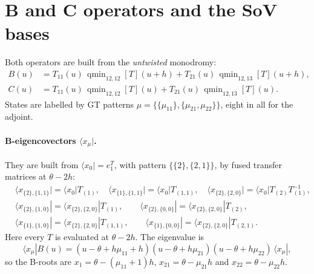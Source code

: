 \documentclass[11pt]{article}
\newcommand{\qmin}{\operatorname{qmin}}
\newcommand{\bra}[1]{\langle #1|}
\begin{document}
\section{B and C operators and the SoV bases}\label{sec:bases}

Both operators are built from the \emph{untwisted} monodromy:
\begin{align}
B(u)&=T_{11}(u)\,\qmin_{12,12}[T](u+h)+T_{21}(u)\,\qmin_{12,13}[T](u+h),\\
C(u)&=T_{11}(u)\,\qmin_{12,12}[T](u)+T_{21}(u)\,\qmin_{12,13}[T](u).
\end{align}
States are labelled by GT patterns $\mu=\{\{\mu_{11}\},\{\mu_{21},\mu_{22}\}\}$, eight in all for the adjoint.

\paragraph{B-eigencovectors $\bra{x_\mu}$.} They are built from $\bra{x_0}=e_1^T$, with pattern $\{\{2\},\{2,1\}\}$, by fused transfer matrices at $\theta-2h$:
\begin{align*}
&\bra{x_{\{2\},\{1,1\}}}=\bra{x_0}T_{(1)},\quad \bra{x_{\{1\},\{1,1\}}}=\bra{x_0}T_{(1,1)},\quad \bra{x_{\{2\},\{2,0\}}}=\bra{x_0}T_{(2)}T_{(1)}^{-1},\\
&\bra{x_{\{2\},\{1,0\}}}=\bra{x_{\{2\},\{2,0\}}}T_{(1)},\qquad \bra{x_{\{2\},\{0,0\}}}=\bra{x_{\{2\},\{2,0\}}}T_{(2)},\\
&\bra{x_{\{1\},\{1,0\}}}=\bra{x_{\{2\},\{2,0\}}}T_{(1,1)},\qquad \bra{x_{\{1\},\{0,0\}}}=\bra{x_{\{2\},\{2,0\}}}T_{(2,1)}.
\end{align*}
Here every $T$ is evaluated at $\theta-2h$. The eigenvalue is
\begin{equation}
\bra{x_\mu}B(u)=(u-\theta+h\mu_{11}+h)(u-\theta+h\mu_{21})(u-\theta+h\mu_{22})\,\bra{x_\mu},
\end{equation}
so the B-roots are $x_1=\theta-(\mu_{11}+1)h$, $x_{21}=\theta-\mu_{21}h$ and $x_{22}=\theta-\mu_{22}h$.
\end{document}
